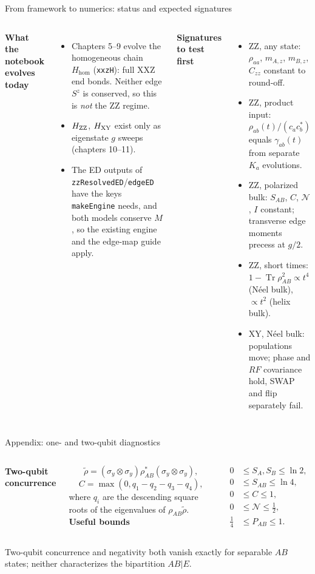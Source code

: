 \documentclass[aspectratio=169,10pt]{beamer}
\newcommand{\Tr}{\operatorname{Tr}}
\newcommand{\HH}{H_{\mathrm{hom}}}
\newcommand{\sechead}[1]{{\color{sea}\bfseries #1}\par\vspace{1mm}}
\newcommand{\noteinline}[1]{{\color{muted}\footnotesize #1}}
\begin{document}
\begin{frame}{From framework to numerics: status and expected signatures}
\begin{columns}[T,onlytextwidth]
\sechead{What the notebook evolves today}
\begin{itemize}\setlength\itemsep{3pt}
\item Chapters 5--9 evolve the homogeneous chain \(\HH\) (\texttt{xxzH}): full XXZ end bonds. Neither edge \(S^z\) is conserved, so this is \emph{not} the ZZ regime.
\item \(H_{\rm ZZ}\), \(H_{\rm XY}\) exist only as eigenstate \(g\) sweeps (chapters 10--11).
\item The ED outputs of \texttt{zzResolvedED}/\texttt{edgeED} have the keys \texttt{makeEngine} needs, and both models conserve \(M\), so the existing engine and the edge-map guide apply.
\end{itemize}
\sechead{Signatures to test first}
\begin{itemize}\setlength\itemsep{3pt}
\item ZZ, any state: \(\rho_{aa}\), \(m_{A,z}\), \(m_{B,z}\), \(C_{zz}\) constant to round-off.
\item ZZ, product input: \(\rho_{ab}(t)/(c_ac_b^*)\) equals \(\gamma_{ab}(t)\) from separate \(K_a\) evolutions.
\item ZZ, polarized bulk: \(S_{AB}\), \(C\), \(\mathcal N\), \(I\) constant; transverse edge moments precess at \(g/2\).
\item ZZ, short times: \(1-\Tr\rho_{AB}^2\propto t^4\) (N\'eel bulk), \(\propto t^2\) (helix bulk).
\item XY, N\'eel bulk: populations move; phase and \(RF\) covariance hold, SWAP and flip separately fail.
\end{itemize}
\end{columns}
\end{frame}


\begin{frame}[plain]
\end{frame}

\appendix
\begin{frame}{Appendix: one- and two-qubit diagnostics}
\begin{columns}[T,onlytextwidth]
\sechead{Two-qubit concurrence}
\[
\widetilde\rho=(\sigma_y\otimes\sigma_y)\rho_{AB}^*(\sigma_y\otimes\sigma_y),
\]
\[
C=\max(0,q_1-q_2-q_3-q_4),
\]
where \(q_i\) are the descending square roots of the eigenvalues of \(\rho_{AB}\widetilde\rho\).
\sechead{Useful bounds}
\[
\begin{aligned}
0&\le S_A,S_B\le\ln2,\\
0&\le S_{AB}\le\ln4,\\
0&\le C\le1,\\
0&\le\mathcal N\le\frac12,\\
\frac14&\le P_{AB}\le1.
\end{aligned}
\]
\end{columns}
\smallskip
\noteinline{Two-qubit concurrence and negativity both vanish exactly for separable \(AB\) states; neither characterizes the bipartition \(AB|E\).}
\end{frame}
\end{document}
